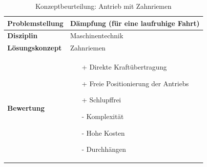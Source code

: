 \documentclass[../../main.tex]{subfiles}
\begin{document}
\begin{flushleft}
    \begin{table}[h]
    \begin{tabular}{ | l | p{11cm} |}
    \hline
    \textbf{Problemstellung} & Dämpfung (für eine laufruhige Fahrt) \\ \hline
    \textbf{Disziplin} & Maschinentechnik \\ \hline
    \textbf{Lösungskonzept} & Zahnriemen \\ \hline
    \textbf{Bewertung} &  \begin{itemize}
                            \item[+] Direkte Kraftübertragung
                            \item[+] Freie Positionierung der Antriebs
                            \item[+] Schlupffrei
                            \item[-] Komplexität
                            \item[-] Hohe Kosten
                            \item[-] Durchhängen
                          \end{itemize} \\ \hline
    \end{tabular}
    \caption{Konzeptbeurteilung: Antrieb mit Zahnriemen}
    \label{tab:konzept_fahrwerk_zahnriemen}
\end{table}
\end{flushleft}
\end{document}
